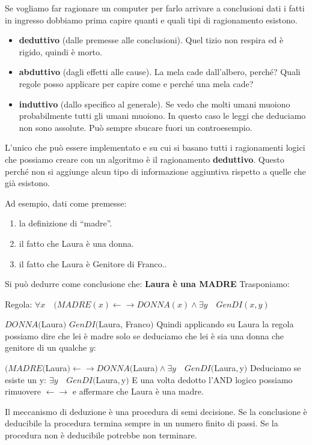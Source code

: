 \noindent Se vogliamo far ragionare un computer per farlo arrivare a conclusioni dati i fatti in ingresso dobbiamo prima capire quanti e quali tipi di ragionamento esistono.
\begin{itemize}
	\item \textbf{deduttivo} (dalle premesse alle conclusioni). Quel tizio non respira ed è rigido, quindi è morto.
	\item \textbf{abduttivo} (dagli effetti alle cause). La mela cade dall'albero, perché? Quali regole posso applicare per capire come e perché una mela cade?
	\item \textbf{induttivo} (dallo specifico al generale). Se vedo che molti umani muoiono probabilmente tutti gli umani muoiono. In questo caso le leggi che deduciamo non sono assolute. Può sempre sbucare fuori un controesempio.
\end{itemize}
L'unico che può essere implementato e su cui si basano tutti i ragionamenti logici che possiamo creare con un algoritmo è il ragionamento \textbf{deduttivo}. Questo perché non si aggiunge alcun tipo di informazione aggiuntiva rispetto a quelle che già esistono.

\begin{info}
	Ad esempio, dati come premesse:
	\begin{enumerate}
		\item la definizione di “madre”.
		\item il fatto che Laura è una donna.
		\item il fatto che Laura è Genitore di Franco..
	\end{enumerate}
	Si può dedurre come conclusione che: \textbf{Laura è una MADRE}\newline\newline
	Trasponiamo:

	Regola: $\forall x \quad (MADRE(x) \leftarrow\rightarrow DONNA(x) \land \exists y \quad GenDI(x,y)$

	$DONNA($Laura$)$
	$GenDI($Laura, Franco$)$\newline
	Quindi applicando su Laura la regola possiamo dire che lei è madre solo se deduciamo che lei è sia una donna che genitore di un qualche $y$:

	$(MADRE($Laura$) \leftarrow\rightarrow DONNA($Laura$) \land \exists y \quad GenDI($Laura$,$y$)$\newline
	Deduciamo se esiste un y:
	$\exists y \quad GenDI($Laura$,$y$)$
	E una volta dedotto l'AND logico possiamo rimuovere $\leftarrow\rightarrow$ e affermare che Laura è una madre.
\end{info}
Il meccanismo di deduzione è una procedura di semi decisione. Se la conclusione è deducibile la procedura termina sempre in un numero finito di passi. Se la procedura non è deducibile potrebbe non terminare.
